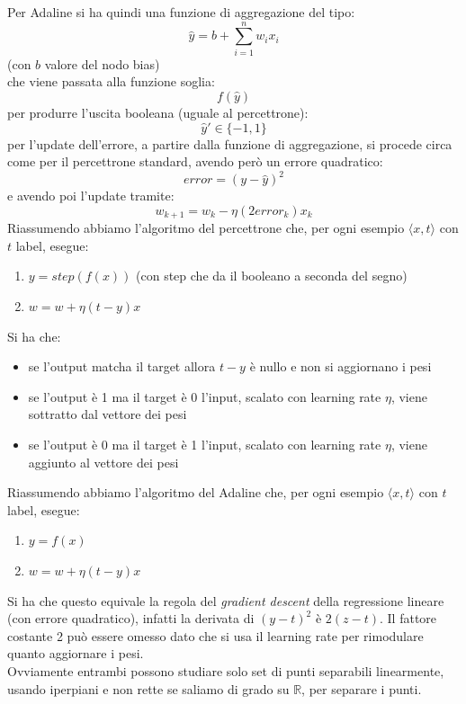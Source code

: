 					Per Adaline si ha quindi una funzione di aggregazione del tipo:
					\[\hat{y}=b+\sum_{i=1}^nw_ix_i\]
					(con $b$ valore del nodo bias)\\
					che viene passata alla funzione soglia:
					\[f(\hat{y})\]
					per produrre l'uscita booleana (uguale al percettrone):
					\[\hat{y}'\in\{-1, 1\}\]
					per l'update dell'errore, a partire dalla funzione di aggregazione, si procede
					circa come per il percettrone standard, avendo però un errore quadratico:
					\[error=(y-\hat{y})^2\]
					e avendo poi l'update tramite:
					\[w_{k+1}=w_k-\eta(2error_k)x_k\]
					Riassumendo abbiamo l'algoritmo del percettrone che, per ogni esempio $\langle
					x, t\rangle$ con $t$ label, esegue:
					\begin{enumerate}
						\item $y=step(f(x))$ (con step che da il booleano a seconda del segno)
						\item $w=w+\eta(t-y)x$
					\end{enumerate}
					Si ha che:
					\begin{itemize}
						\item se l'output matcha il target allora $t-y$ è nullo e non si aggiornano i
						      pesi
						\item se l'output è 1 ma il target è 0 l'input, scalato con learning rate
						      $\eta$, viene sottratto dal vettore dei pesi
						\item se l'output è 0 ma il target è 1 l'input, scalato con learning rate
						      $\eta$, viene aggiunto al vettore dei pesi
					\end{itemize}
					Riassumendo abbiamo l'algoritmo del Adaline che, per ogni esempio $\langle
					x, t\rangle$ con $t$ label, esegue:
					\begin{enumerate}
						\item $y=f(x)$
						\item $w=w+\eta(t-y)x$
					\end{enumerate}
					Si ha che questo equivale la regola del \textit{gradient descent} della
					regressione lineare (con errore quadratico), infatti la derivata di $(y-t)^2$ è
					$2(z-t)$. Il fattore costante 2 può essere omesso dato che si usa il learning
					rate per rimodulare quanto aggiornare i pesi.\\
					Ovviamente entrambi possono studiare solo set di punti separabili linearmente,
					usando iperpiani e non rette se saliamo di grado su $\mathbb{R}$, per separare i
					punti.
